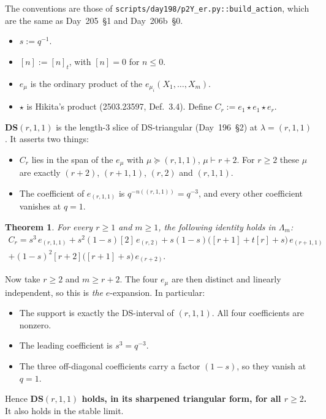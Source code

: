 \documentclass[11pt]{amsart}
\newtheorem{theorem}{Theorem}
\theoremstyle{remark}
\newcommand{\tn}[1]{[#1]}
\newcommand{\st}{\star}
\begin{document}
The conventions are those of \texttt{scripts/day198/p2Y\_er.py::build\_action}, which are the same as Day~205~\S1 and Day~206b~\S0.
\begin{itemize}
\item $s := q^{-1}$.
\item $\tn{n} := \tn{n}_t$, with $\tn{n}=0$ for $n\le 0$.
\item $e_\mu$ is the ordinary product of the $e_{\mu_i}(X_1,\dots,X_m)$.
\item $\st$ is Hikita's product (2503.23597, Def.~3.4). Define $C_r := e_1\st e_1\st e_r$.
\end{itemize}

\noindent\textbf{DS$(r,1,1)$} is the length-3 slice of DS-triangular (Day~196~\S2) at $\lambda=(r,1,1)$. It asserts two things:
\begin{itemize}
\item $C_r$ lies in the span of the $e_\mu$ with $\mu\succeq(r,1,1)$, $\mu\vdash r+2$. For $r\ge2$ these $\mu$ are exactly $(r+2)$, $(r+1,1)$, $(r,2)$ and $(r,1,1)$.
\item The coefficient of $e_{(r,1,1)}$ is $q^{-n((r,1,1))}=q^{-3}$, and every other coefficient vanishes at $q=1$.
\end{itemize}

\begin{theorem}\label{thm:main}
For every $r\ge1$ and $m\ge1$, the following identity holds in $\Lambda_m$:
\begin{multline*}
C_r = s^3\,e_{(r,1,1)} + s^2(1-s)\tn{2}\,e_{(r,2)} + s(1-s)\bigl(\tn{r+1}+t\tn{r}+s\bigr)\,e_{(r+1,1)}\\
 + (1-s)^2\tn{r+2}\bigl(\tn{r+1}+s\bigr)\,e_{(r+2)}.
\end{multline*}
\end{theorem}

Now take $r\ge2$ and $m\ge r+2$. The four $e_\mu$ are then distinct and linearly independent, so this is \emph{the} $e$-expansion. In particular:
\begin{itemize}
\item The support is exactly the DS-interval of $(r,1,1)$. All four coefficients are nonzero.
\item The leading coefficient is $s^3=q^{-3}$.
\item The three off-diagonal coefficients carry a factor $(1-s)$, so they vanish at $q=1$.
\end{itemize}
Hence \textbf{DS$(r,1,1)$ holds, in its sharpened triangular form, for all $r\ge2$.} It also holds in the stable limit.
\end{document}
